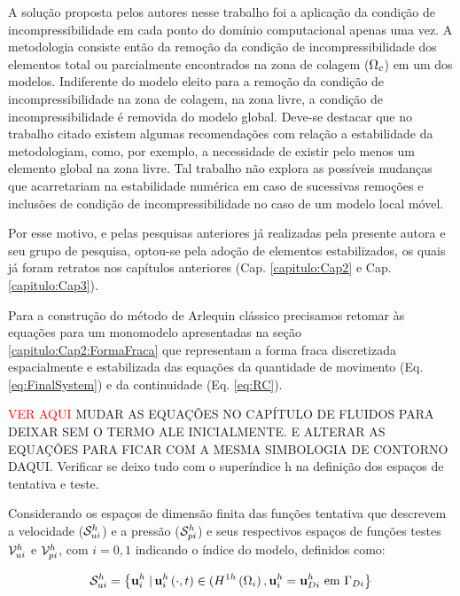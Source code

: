 \documentclass[tese_patricia]{subfiles}
\begin{document}
A solução proposta pelos autores nesse trabalho foi a aplicação da condição de incompressibilidade em cada ponto do domínio computacional apenas uma vez. A metodologia consiste então da remoção da condição de incompressibilidade dos elementos total ou parcialmente encontrados na zona de colagem ($\Omega_c$) em um dos modelos. Indiferente do modelo eleito para a remoção da condição de incompressibilidade na zona de colagem, na zona livre, a condição de incompressibilidade é removida do modelo global. Deve-se destacar que no trabalho citado existem algumas recomendações com relação a estabilidade da metodologiam, como, por exemplo, a necessidade de existir pelo menos um elemento global na zona livre. Tal trabalho não explora as possíveis mudanças que acarretariam na estabilidade numérica em caso de sucessivas remoções e inclusões de condição de incompressibilidade no caso de um modelo local móvel.

Por esse motivo, e pelas pesquisas anteriores já realizadas pela presente autora e seu grupo de pesquisa, optou-se pela adoção de elementos estabilizados, os quais já foram retratos nos capítulos anteriores (Cap. \ref{capitulo:Cap2} e Cap. \ref{capitulo:Cap3}).

Para a construção do método de Arlequin clássico precisamos retomar às equações para um monomodelo apresentadas na seção \ref{capitulo:Cap2:FormaFraca} que representam a forma fraca discretizada espacialmente e estabilizada das equações da quantidade de movimento (Eq. \ref{eq:FinalSystem}) e da continuidade (Eq. \ref{eq:RC}). 


\textcolor{red}{VER AQUI}
MUDAR AS EQUAÇÕES NO CAPÍTULO DE FLUIDOS PARA DEIXAR SEM O TERMO ALE INICIALMENTE. E ALTERAR AS EQUAÇÕES PARA FICAR COM A MESMA SIMBOLOGIA DE CONTORNO DAQUI. Verificar se deixo tudo com o superíndice h na definição dos espaços de tentativa e teste.

Considerando os espaços de dimensão finita das funções tentativa que descrevem a velocidade ($\mathcal{S}_{ui}^h$) e a pressão ($\mathcal{S}_{pi}^h$) e seus respectivos espaços de funções testes $\mathcal{V}_{ui}^h$ e $\mathcal{V}_{pi}^h$, com $i = 0,1$ indicando o índice do modelo, definidos como:

\begin{align}
	\mathcal{S}_{ui}^h = \left\{\mathbf{u}_{i}^{h} \left . \right| \mathbf{u}_{i}^{h} \left(\cdot,t\right) \in (H^{1h}\left(\Omega_{i}\right), \mathbf{u}_{i}^{h} = \mathbf{u}_{Di}^{h} \textrm { em}  \ \Gamma_{Di} \right\}
\end{align}
\end{document}
